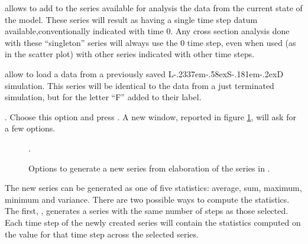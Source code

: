 \documentclass [11pt,a4paper] {book}
\def\LsD{{L\kern-.2337em\lower-.58ex\hbox{S}\kern-.181em\lower-.2ex\hbox{D}}\xspace}
\begin{document}
 allows to add to the series available for analysis the data from the current state of the model. These series will result as having a single time step datum available,conventionally indicated with time 0. Any cross section analysis done with these ``singleton'' series will always use the 0 time step, even when used (as in the scatter plot) with other series indicated with other time steps. 

 allow to load a data from a previously saved \LsD simulation. This series will be identical to the data from a just terminated simulation, but for the letter ``F'' added to their label.

. Choose this option and press . A new window, reported in figure \ref{fig:createseries}, will ask for a few options.

\begin{figure}[ht]
  \centering
  \caption{\small Options to generate a new series from elaboration of the series in .}.
   \label{fig:createseries}
\end{figure}

The new series can be generated as one of five statistics: average, sum, maximum, minimum and variance. There are two possible ways to compute the statistics. The first, , generates a series with the same number of steps as those selected. Each time step of the newly created series will contain the statistics computed on the value for that time step across the selected series. 
\end{document}
